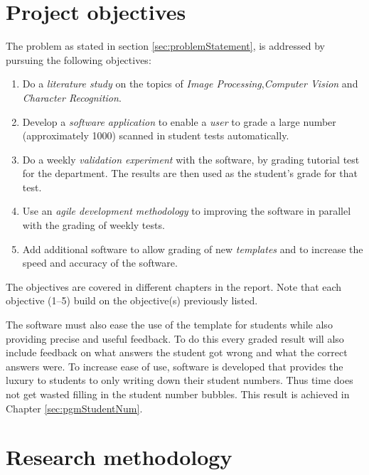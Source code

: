 \section{Project objectives}
\label{sec:Objectives}

The problem as stated in section \ref{sec:problemStatement}, is addressed by pursuing the following objectives:
\begin{enumerate}
  \item Do a \textsl{literature study} on the topics of \textsl{Image Processing},\textsl{Computer Vision} and \textsl{Character Recognition}.
  \item Develop a \textsl{software application} to enable a \textsl{user} to grade a large number (approximately 1000) scanned in student tests automatically.
  \item Do a weekly \textsl{validation experiment} with the software, by grading tutorial test for the department. The results are then used as the student's grade for that test.
  \item Use an \textsl{agile development methodology} to improving the software in parallel with the grading of weekly tests.
  \item Add additional software to allow grading of new \textsl{templates} and to increase the speed and accuracy of the software.
\end{enumerate}

The objectives are covered in different chapters in the report. Note that each objective (1--5) build on the objective(s) previously listed.

The software must also ease the use of the template for students while also providing precise and useful feedback. To do this every graded result will also include feedback on what answers the student got wrong and what the correct answers were. To increase ease of use, software is developed that provides the luxury to students to only writing down their student numbers. Thus time does not get wasted filling in the student number bubbles. This result is achieved in Chapter \ref{sec:pgmStudentNum}.

\section{Research methodology}

